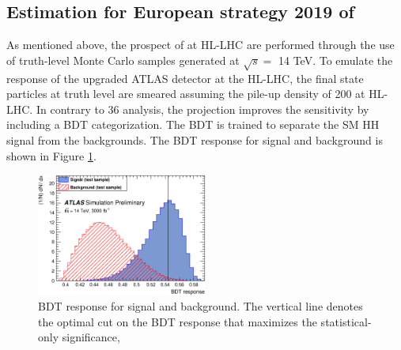 \subsection{Estimation for European strategy 2019 of \bbyy}
As mentioned above, the prospect of \HHyybb at HL-LHC are performed through the use of truth-level Monte Carlo samples generated at $\sqrt{s} = $ 14 TeV. To emulate the response of the upgraded ATLAS detector at the HL-LHC, the final state particles at truth level are smeared assuming the pile-up density of 200 at HL-LHC. In contrary to 36 \ifb analysis, the projection improves the sensitivity by including a BDT categorization. The BDT is trained to separate the SM HH signal from the backgrounds. The BDT response for signal and background is shown in Figure \ref{fig:HL-LHC:36ifb:BDT}. 

\begin{figure}[htbp]
    \centering
    \includegraphics[width=0.5\textwidth]{Ch6/Img/figures_bbyy_overtrainTestOnly.eps}
    \caption{BDT response for signal and background. The vertical line denotes the optimal cut on the BDT response that maximizes the statistical-only significance,}
    \label{fig:HL-LHC:36ifb:BDT}
\end{figure}

